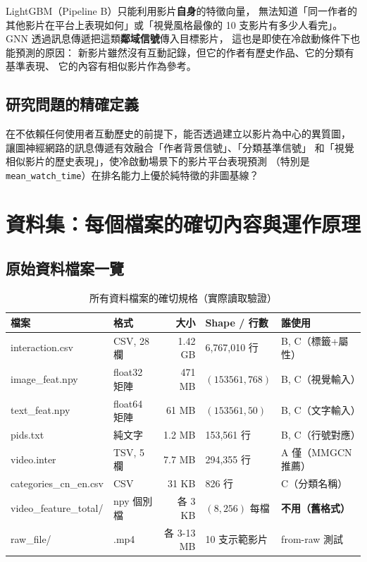 \documentclass[12pt, a4paper]{article}
\begin{document}
LightGBM（Pipeline B）只能利用影片\textbf{自身}的特徵向量，
無法知道「同一作者的其他影片在平台上表現如何」或「視覺風格最像的 10 支影片有多少人看完」。
GNN 透過訊息傳遞把這類\textbf{鄰域信號}傳入目標影片，
這也是即使在冷啟動條件下也能預測的原因：
新影片雖然沒有互動記錄，但它的作者有歷史作品、它的分類有基準表現、
它的內容有相似影片作為參考。

\subsection{研究問題的精確定義}

\begin{infobox2}[本報告的核心研究問題]
在不依賴任何使用者互動歷史的前提下，能否透過建立以影片為中心的異質圖，
讓圖神經網路的訊息傳遞有效融合「作者背景信號」、「分類基準信號」
和「視覺相似影片的歷史表現」，使冷啟動場景下的影片平台表現預測
（特別是 \texttt{mean\_watch\_time}）在排名能力上優於純特徵的非圖基線？
\end{infobox2}

\section{資料集：每個檔案的確切內容與運作原理}
\label{sec:data}

\subsection{原始資料檔案一覽}

\begin{table}[H]
\centering
\caption{所有資料檔案的確切規格（實際讀取驗證）}
\label{tab:files}
\footnotesize
\begin{tabular}{llrll}
\toprule
\textbf{檔案} & \textbf{格式} & \textbf{大小} & \textbf{Shape / 行數} & \textbf{誰使用} \\
\midrule
interaction.csv      & CSV, 28 欄   & 1.42 GB & 6,767,010 行  & B, C（標籤+屬性） \\
image\_feat.npy      & float32 矩陣  & 471 MB  & $(153561,768)$ & B, C（視覺輸入） \\
text\_feat.npy       & float64 矩陣  & 61 MB   & $(153561,50)$  & B, C（文字輸入） \\
pids.txt             & 純文字        & 1.2 MB  & 153,561 行    & B, C（行號對應） \\
video.inter          & TSV, 5 欄    & 7.7 MB  & 294,355 行    & A 僅（MMGCN 推薦） \\
categories\_cn\_en.csv & CSV       & 31 KB   & 826 行        & C（分類名稱） \\
video\_feature\_total/ & npy 個別檔 & 各 3 KB & $(8,256)$ 每檔 & \textbf{不用（舊格式）} \\
raw\_file/           & .mp4         & 各 3-13 MB & 10 支示範影片 & from-raw 測試 \\
\bottomrule
\end{tabular}
\end{table}
\end{document}
